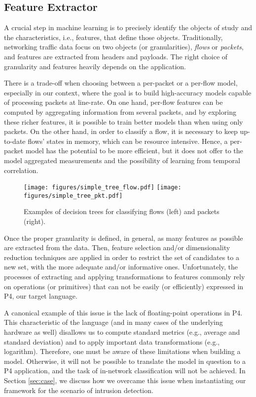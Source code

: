

\subsection{Feature Extractor}\label{sub:features}

A crucial step in machine learning is to precisely identify the objects of study and the characteristics, i.e., features, that define those objects.
Traditionally, networking traffic data focus on two objects (or granularities), \emph{flows} or \emph{packets}, and features are extracted from headers and payloads.
The right choice of granularity and features heavily depends on the application. 

There is a trade-off when choosing between a per-packet or a per-flow model, especially in our context, where the goal is to build high-accuracy models capable of processing packets at line-rate. On one hand, per-flow features can be computed by aggregating information from several packets, and by exploring these richer features, it is possible to train better models than when using only packets. On the other hand, in order to classify a flow, it is necessary to keep up-to-date flows' states in memory, which can be resource intensive. Hence, a per-packet model has the potential to be more efficient, but it does not offer to the model aggregated measurements and the possibility of learning from temporal correlation.

\begin{figure*}[t] 
    \centering
        \texttt{[image: figures/simple\_tree\_flow.pdf]}
        \texttt{[image: figures/simple\_tree\_pkt.pdf]}
        \caption{Examples of decision trees for classifying flows (left) and packets (right).}
        \label{fig:dtexample}
\end{figure*}

Once the proper granularity is defined, in general, as many features as possible are extracted from the data. Then, feature selection and/or dimensionality reduction techniques are applied in order to restrict the set of candidates to a new set, with the more adequate and/or informative ones. 
Unfortunately, the processes of extracting and applying transformations to features commonly rely on operations (or primitives) that can not be easily (or efficiently) expressed in P4, our target language.

A canonical example of this issue is the lack of floating-point operations in P4. This characteristic of the language (and in many cases of the underlying hardware as well) disallows us to compute standard metrics (e.g., average and standard deviation) and to apply important data transformations (e.g., logarithm). Therefore, one must be aware of these limitations when building a model. Otherwise, it will not be possible to translate the model in question to a P4 application, and the task of in-network classification will not be achieved.
In Section \ref{sec:case}, we discuss how we overcame this issue when instantiating our framework for the scenario of intrusion detection.


